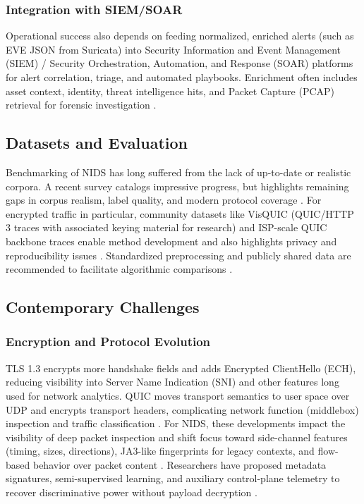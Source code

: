 \subsubsection{Integration with SIEM/SOAR} 
Operational success also depends on feeding normalized, enriched alerts (such as EVE JSON from Suricata) into Security Information and Event Management (SIEM) / Security Orchestration, Automation, and Response (SOAR) platforms for alert correlation, triage, and automated playbooks. Enrichment often includes asset context, identity, threat intelligence hits, and Packet Capture (PCAP) retrieval for forensic investigation \parencite{SuricataDocs2025,Diana2025Overview}.

\subsection{Datasets and Evaluation} 
Benchmarking of NIDS has long suffered from the lack of up-to-date or realistic corpora. A recent survey catalogs impressive progress, but highlights remaining gaps in corpus realism, label quality, and modern protocol coverage \parencite{KBS2025Datasets,AppliedIntelligence2025Benchmark}. For encrypted traffic in particular, community datasets like VisQUIC (QUIC/HTTP 3 traces with associated keying material for research) and ISP-scale QUIC backbone traces enable method development and also highlights privacy and reproducibility issues \parencite{VisQUIC2024,QUICBackbone2023}. Standardized preprocessing and publicly shared data are recommended to facilitate algorithmic comparisons \parencite{AppliedIntelligence2025Benchmark}.

\subsection{Contemporary Challenges} 
\subsubsection{Encryption and Protocol Evolution} 
TLS 1.3 encrypts more handshake fields and adds Encrypted ClientHello (ECH), reducing visibility into Server Name Indication (SNI) and other features long used for network analytics. QUIC moves transport semantics to user space over UDP and encrypts transport headers, complicating network function (middlebox) inspection and traffic classification \parencite{Zhou2024TLS13Survey,Enigma2025ETC}. For NIDS, these developments impact the visibility of deep packet inspection and shift focus toward side-channel features (timing, sizes, directions), JA3-like fingerprints for legacy contexts, and flow-based behavior over packet content \parencite{Zhou2024TLS13Survey,VisQUIC2024}. Researchers have proposed metadata signatures, semi-supervised learning, and auxiliary control-plane telemetry to recover discriminative power without payload decryption \parencite{EncryptedNIDS2022,VisQUIC2024,QUICBackbone2023}.

